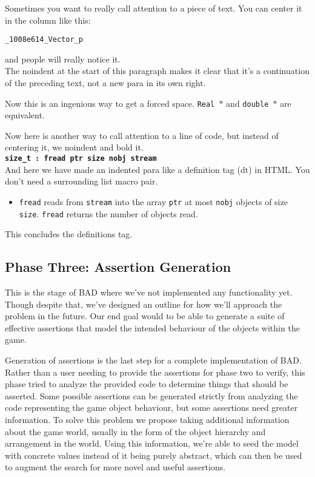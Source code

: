 \documentclass[letterpaper,twocolumn,10pt]{article}
\begin{document}
Sometimes you want to really call attention to a piece of text.  You
can center it in the column like this:
\begin{center}
{\tt \_1008e614\_Vector\_p}
\end{center}
and people will really notice it.\\

\noindent
The noindent at the start of this paragraph makes it clear that it's
a continuation of the preceding text, not a new para in its own right.


Now this is an ingenious way to get a forced space.
{\tt Real~$*$} and {\tt double~$*$} are equivalent. 

Now here is another way to call attention to a line of code, but instead
of centering it, we noindent and bold it.\\

\noindent
{\bf \tt size\_t : fread ptr size nobj stream } \\

And here we have made an indented para like a definition tag (dt)
in HTML.  You don't need a surrounding list macro pair.
\begin{itemize}
\item[]  {\tt fread} reads from {\tt stream} into the array {\tt ptr} at
most {\tt nobj} objects of size {\tt size}.   {\tt fread} returns
the number of objects read. 
\end{itemize}
This concludes the definitions tag.

\subsection{Phase Three: Assertion Generation}

This is the stage of BAD where we've not implemented any functionality yet. Though despite that, we've designed an outline for how we'll approach the problem in the future. Our end goal would to be able to generate a suite of effective assertions that model the intended behaviour of the objects within the game.

Generation of assertions is the last step for a complete implementation of BAD. Rather than a user needing to provide the assertions for phase two to verify, this phase tried to analyze the provided code to determine things that should be asserted. Some possible assertions can be generated strictly from analyzing the code representing the game object behaviour, but some assertions need greater information. To solve this problem we propose taking additional information about the game world, usually in the form of the object hierarchy and arrangement in the world. Using this information, we're able to seed the model with concrete values instead of it being purely abstract, which can then be used to augment the search for more novel and useful assertions.
\end{document}
